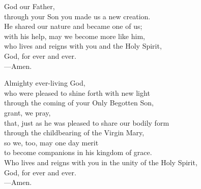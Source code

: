 \prayer

\begin{prayerverse}

God our Father,\\
through your Son you made us a new creation.\\
He shared our nature and became one of us;\\
with his help, may we become more like him,\\
who lives and reigns with you and the Holy Spirit,\\
God, for ever and ever.\\
{\color{red}---\thinspace}Amen.

\end{prayerverse}


\begin{prayerverse}

Almighty ever-living God,\\
who were pleased to shine forth with new light\\
through the coming of your Only Begotten Son,\\
grant, we pray,\\
that, just as he was pleased to share our bodily form\\
through the childbearing of the Virgin Mary,\\
so we, too, may one day merit\\
to become companions in his kingdom of grace.\\
Who lives and reigns with you in the unity of the Holy Spirit,\\
God, for ever and ever.\\
{\color{red}---\thinspace}Amen.

\end{prayerverse}